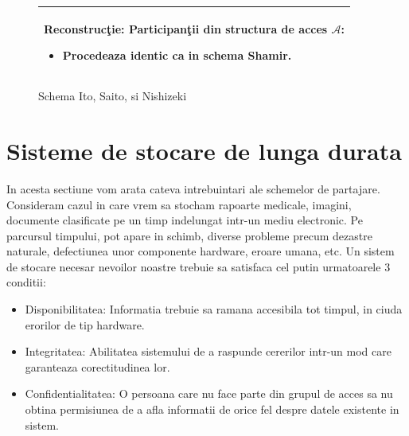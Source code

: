 \documentclass{llncs}
\begin{document}
\begin{figure}[h!]
\begin{tabular}{|p{\textwidth}|}
\hspace{.1in}
\textbf{Reconstruc\c{t}ie}: Participan\c{t}ii din structura de acces $\mathcal{A}$:
	\begin{itemize}
		\item Procedeaza identic ca in schema Shamir.
	\end{itemize}


\\
\hline
\end{tabular}

\caption{Schema Ito, Saito, si Nishizeki \cite{ITO:1989}}
\label{fig:ito_et_al}
\end{figure}





\section{Sisteme de stocare de lunga durata}

In acesta sectiune vom arata cateva intrebuintari ale schemelor de partajare. Consideram cazul in care vrem sa stocham rapoarte medicale, imagini, documente clasificate pe un timp indelungat intr-un mediu electronic. Pe parcursul timpului, pot apare in schimb, diverse probleme precum dezastre naturale, defectiunea unor componente hardware, eroare umana, etc. \cite{SGMV:2009}
Un sistem de stocare necesar nevoilor noastre trebuie sa satisfaca cel putin urmatoarele 3 conditii:
\begin{itemize}
	\item Disponibilitatea: Informatia trebuie sa ramana accesibila tot timpul, in ciuda erorilor de tip hardware.
	\item Integritatea: Abilitatea sistemului de a raspunde cererilor intr-un mod care garanteaza corectitudinea lor.
	\item Confidentialitatea: O persoana care nu face parte din grupul de acces sa nu obtina permisiunea de a afla informatii de orice fel despre datele existente in sistem.
\end{itemize}
\end{document}
